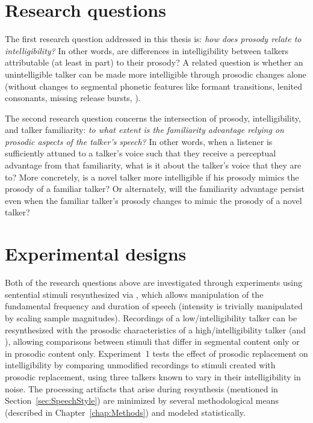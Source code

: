 \section{Research questions}
The first research question addressed in this thesis is: {\em how does prosody relate to intelligibility?}  In other words, are differences in intelligibility between talkers attributable (at least in part) to their prosody?  A related question is whether an unintelligible talker can be made more intelligible through prosodic changes alone (without changes to segmental phonetic features like formant transitions, lenited consonants, missing release bursts, \etc).


The second research question concerns the intersection of prosody, intelligibility, and talker familiarity: {\em to what extent is the familiarity advantage relying on prosodic aspects of the talker’s speech?}  In other words, when a  listener is sufficiently attuned to a talker’s voice such that they receive a perceptual advantage from that familiarity, what is it about the talker’s voice that they are  to?  More concretely, is a novel talker more intelligible if his prosody mimics the prosody of a familiar talker?  Or alternately, will the familiarity advantage persist even when the familiar talker’s prosody changes to mimic the prosody of a novel talker?

\section{Experimental designs\label{sec:ExpDesign}}
Both of the research questions above are investigated through experiments using sentential stimuli resynthesized via \psola{} \citep{MoulinesCharpentier1990}, which allows manipulation of the fundamental frequency and duration of speech (intensity is trivially manipulated by scaling sample magnitudes).  Recordings of a low\-/intelligibility talker can be resynthesized with the prosodic characteristics of a high\-/intelligibility talker (and \vv), allowing comparisons between stimuli that differ in segmental content only or in prosodic content only.  Experiment~1 tests the effect of prosodic replacement on intelligibility by comparing unmodified recordings to stimuli created with prosodic replacement, using three talkers known to vary in their intelligibility in noise.  The processing artifacts that arise during resynthesis (mentioned in Section~\ref{sec:SpeechStyle}) are minimized by several methodological means (described in Chapter~\ref{chap:Methods}) and modeled statistically. 

